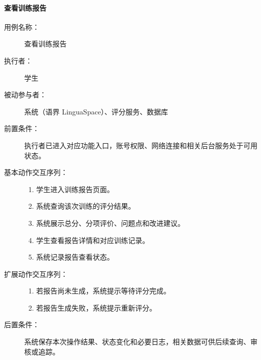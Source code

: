 \paragraph{查看训练报告}
\begin{description}
  \item[用例名称：] 查看训练报告
  \item[执行者：] 学生
  \item[被动参与者：] 系统（语界 LinguaSpace）、评分服务、数据库
  \item[前置条件：] 执行者已进入对应功能入口，账号权限、网络连接和相关后台服务处于可用状态。
  \item[基本动作交互序列：]
  \begin{enumerate}
    \item 学生进入训练报告页面。
    \item 系统查询该次训练的评分结果。
    \item 系统展示总分、分项评价、问题点和改进建议。
    \item 学生查看报告详情和对应训练记录。
    \item 系统记录报告查看状态。
  \end{enumerate}
  \item[扩展动作交互序列：]
  \begin{enumerate}
    \item[2a.] 若报告尚未生成，系统提示等待评分完成。
    \item[2b.] 若报告生成失败，系统提示重新评分。
  \end{enumerate}
  \item[后置条件：] 系统保存本次操作结果、状态变化和必要日志，相关数据可供后续查询、审核或追踪。
\end{description}

